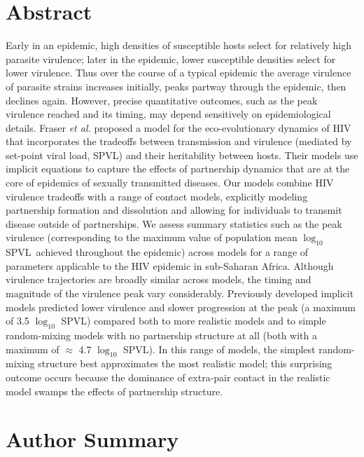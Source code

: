 \documentclass[10pt,letterpaper]{article}
\newcommand{\Lspvl}{$\log_{10}$ SPVL}
\begin{document}
\section*{Abstract}
Early in an epidemic, high densities of susceptible hosts
select for relatively high parasite virulence; later in the epidemic,
lower susceptible densities select for lower virulence.
Thus over the course of a typical epidemic the average virulence 
of parasite strains increases initially,
peaks partway through the epidemic, then declines again.
However, precise quantitative outcomes, such as the peak virulence reached
and its timing, may depend sensitively on epidemiological details. 
Fraser \emph{et al.}
proposed a model for the eco-evolutionary
dynamics of HIV that incorporates
the tradeoffs between transmission and virulence (mediated by
set-point viral load, SPVL) and their heritability between
hosts. Their models use implicit equations to
capture the effects of partnership dynamics that are at the core of 
epidemics of sexually transmitted diseases. 
Our models combine HIV virulence tradeoffs with a range of
contact models, explicitly modeling partnership formation and
dissolution and allowing for individuals to transmit disease outside
of partnerships. We assess summary statistics such as the peak virulence
(corresponding to the maximum value of population mean \Lspvl\ achieved throughout the epidemic) across
models for a range of 
parameters applicable to the HIV epidemic in sub-Saharan Africa.
Although virulence trajectories are broadly similar
across models, the timing and magnitude of the 
virulence peak vary
considerably.
Previously developed implicit models predicted 
lower virulence and slower progression
at the peak (a maximum of 3.5 \Lspvl) compared both to more realistic models
and to simple random-mixing models with no partnership structure
at all (both with a maximum of $\approx$ 4.7 \Lspvl).
In this range of models, the simplest random-mixing structure best
approximates the most realistic model; this
surprising outcome occurs because the dominance of extra-pair
contact in the realistic model swamps the effects of
partnership structure.

\section*{Author Summary}
\end{document}
